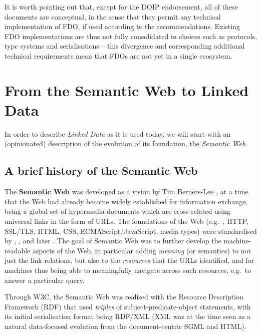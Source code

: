 It is worth pointing out that, except for the DOIP endorsement, all of these documents are conceptual, in the sense that they permit any technical implementation of FDO, if used according to the recommendations. 
Existing FDO implementations \cite{Wittenburg 2022a} are thus not fully consolidated in choices such as protocols, type systems and serialisations -- this divergence and corresponding additional technical requirements mean that FDOs are not yet in a single ecosystem.


\section{From the Semantic Web to Linked Data}\label{ch3:ld}

In order to describe \emph{Linked Data} as it is used today, we will start with an (opinionated) description of the evolution of its foundation, the \emph{Semantic Web}.

\subsection{A brief history of the Semantic Web}\label{ch3:semweb}

The \textbf{Semantic Web} was developed as a vision by Tim Berners-Lee \cite{Berners-Lee 1999}, at a time that the Web had already become widely established for information exchange, being a global set of hypermedia documents which are cross-related using universal links in the form of URLs. The foundations of the Web (e.g.~, \acrshort{HTTP}, \acrshort{SSL}/\acrshort{TLS}, \acrshort{HTML}, CSS, ECMAScript/JavaScript, media types) were standardised by , ,  and later . The goal of Semantic Web was to further develop the machine-readable aspects of the Web, in particular adding \emph{meaning} (or semantics) to not just the link relations, but also to the \emph{resources} that the URLs identified, and for machines thus being able to meaningfully navigate across such resources, e.g.~to answer a particular query.

Through W3C, the Semantic Web was realised with the Resource Description Framework (RDF) \cite{Schreiber 2014} that used \emph{triples} of subject-predicate-object statements, with its initial serialisation format \cite{Lassila 1999} being RDF/XML (XML was at the time seen as a natural data-focused evolution from the document-centric SGML and HTML).

